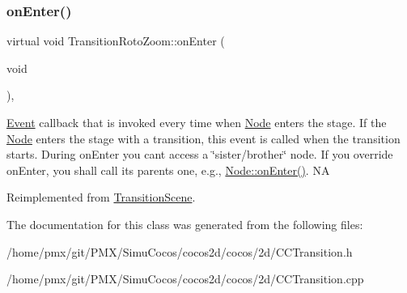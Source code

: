 \subsubsection{\texorpdfstring{on\+Enter()}{onEnter()}\hspace{0.1cm}{\footnotesize\ttfamily [2/2]}}
{\footnotesize\ttfamily virtual void Transition\+Roto\+Zoom\+::on\+Enter (\begin{DoxyParamCaption}\item[{void}]{ }\end{DoxyParamCaption})\hspace{0.3cm}{\ttfamily [override]}, {\ttfamily [virtual]}}

\hyperlink{classEvent}{Event} callback that is invoked every time when \hyperlink{classNode}{Node} enters the \textquotesingle{}stage\textquotesingle{}. If the \hyperlink{classNode}{Node} enters the \textquotesingle{}stage\textquotesingle{} with a transition, this event is called when the transition starts. During on\+Enter you can\textquotesingle{}t access a \char`\"{}sister/brother\char`\"{} node. If you override on\+Enter, you shall call its parent\textquotesingle{}s one, e.\+g., \hyperlink{classNode_a7f51764c4afd5018a052b9ef71c03374}{Node\+::on\+Enter()}.  NA 

Reimplemented from \hyperlink{classTransitionScene_aace390a1bd8f3c73bb650a1e256a0f83}{Transition\+Scene}.



The documentation for this class was generated from the following files\+:\begin{DoxyCompactItemize}
\item 
/home/pmx/git/\+P\+M\+X/\+Simu\+Cocos/cocos2d/cocos/2d/C\+C\+Transition.\+h\item 
/home/pmx/git/\+P\+M\+X/\+Simu\+Cocos/cocos2d/cocos/2d/C\+C\+Transition.\+cpp\end{DoxyCompactItemize}
